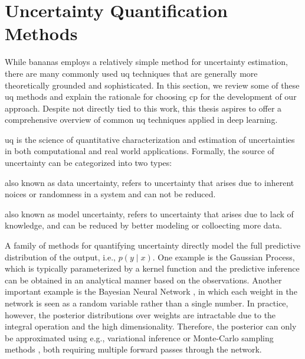 \documentclass[a4paper,oneside,bibliography=totoc]{scrbook}
\begin{document}
\section{Uncertainty Quantification Methods}
While \gls{bananas} employs a relatively simple method for uncertainty estimation, there are many commonly used \gls{uq} techniques that are generally more theoretically grounded and sophisticated. In this section, we review some of these \gls{uq} methods and explain the rationale for choosing \gls{cp} for the development of our approach. Despite not directly tied to this work, this thesis aspires to offer a comprehensive overview of common \gls{uq} techniques applied in deep learning.

\gls{uq} is the science of quantitative characterization and estimation of uncertainties in both computational and real world applications. Formally, the source of uncertainty can be categorized into two types:

\begin{description}[leftmargin=0cm]
\item[Aleatory Uncertainty:] also known as data uncertainty, refers to uncertainty that arises due to inherent noices or randomness in a system and can not be reduced. \item[Epistemic Uncertainty:] also known as model uncertainty, refers to uncertainty that arises due to lack of knowledge, and can be reduced by better modeling or colloecting more data.
\end{description}

A family of methods for quantifying uncertainty directly model the full predictive distribution of the output, i.e., $p(y \mid x)$. One example is the Gaussian Process, which is typically parameterized by a kernel function and the predictive inference can be obtained in an analytical manner based on the observations. Another important example is the Bayesian Neural Network \cite{kendall2017uncertainties, neal1996bayesian}, in which each weight in the network is seen as a random variable rather than a single number. In practice, however, the posterior distributions over weights are intractable due to the integral operation and the high dimensionality. Therefore, the posterior can only be approximated using e.g.,  variational inference or Monte-Carlo sampling methods \cite{neal1996bayesian, springenberg2016bayesian}, both requiring multiple forward passes through the network. 
\end{document}
